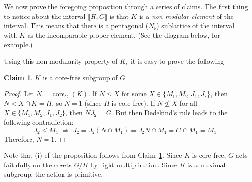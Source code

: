 \documentclass{gen-j-l}
\newcommand{\lb}{\ensuremath{\llbracket}}
\newcommand{\rb}{\ensuremath{\rrbracket}}
\newcommand{\<}{\ensuremath{\langle}}
\renewcommand{\>}{\ensuremath{\rangle}}
\theoremstyle{plain}
\theoremstyle{definition}
\newcounter{claim}
\newtheorem{claim}[claim]{Claim}
\theoremstyle{remark}
\numberwithin{theorem}{section}
\numberwithin{claim}{section}
\numberwithin{equation}{section}
\numberwithin{conjecture}{section}
\newcommand{\defn}[1]{\emph{#1}}
\renewcommand{\leq}{\ensuremath{\leqslant}}
\renewcommand{\nleq}{\ensuremath{\nleqslant}}
\newcommand{\core}{\ensuremath{\operatorname{core}}}
\newcommand{\2}{\ensuremath{\mathbf{2}}}
\newcommand{\3}{\ensuremath{\mathbf{3}}}
\begin{document}
We now prove the foregoing proposition through a series of claims.
The first thing to notice about the interval $\lb H,G \rb$ is that
$K$ is a \defn{non-modular element} of the interval.  This means that
there is a pentagonal ($N_5$) sublattice of the interval with $K$ as the
incomparable proper element. (See the diagram below, for example.)
\begin{center}
  {
}
\end{center}
Using this non-modularity property of $K,$ it is easy to 
prove the following
\begin{claim}
\label{claim:K1corefree}
$K$ is a core-free subgroup of $G$.
\end{claim}
\begin{proof}
  Let $N = \core_G(K)$.  If $N \leq X$ for some $X \in \{M_1, M_2, J_1, J_2\}$, 
then $N < X\cap K = H$, so $N = 1$ (since $H$ is core-free).  If
  $N\nleq X$ for all $X \in \{M_1, M_2, J_1, J_2\}$, then $NJ_2 = G$.  But then
Dedekind's rule leads to the following contradiction:
\[
J_2 \leq M_1 \; \Longrightarrow \; J_2 = J_2(N\cap M_1) = J_2 N \cap M_1 =
G\cap M_1 = M_1.
\]
Therefore, $N = 1$.
\end{proof}
Note that (i) of the proposition follows from Claim~\ref{claim:K1corefree}.  Since
$K$ is core-free, $G$ acts faithfully on the
cosets $G/K$ by right multiplication.  Since $K$ is a maximal subgroup, the
action is primitive.
\end{document}
